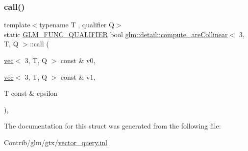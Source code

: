 \subsubsection{\texorpdfstring{call()}{call()}}
{\footnotesize\ttfamily template$<$typename T , qualifier Q$>$ \\
static \mbox{\hyperlink{setup_8hpp_a33fdea6f91c5f834105f7415e2a64407}{G\+L\+M\+\_\+\+F\+U\+N\+C\+\_\+\+Q\+U\+A\+L\+I\+F\+I\+ER}} bool \mbox{\hyperlink{structglm_1_1detail_1_1compute__are_collinear}{glm\+::detail\+::compute\+\_\+are\+Collinear}}$<$ 3, T, Q $>$\+::call (\begin{DoxyParamCaption}\item[{\mbox{\hyperlink{structglm_1_1vec}{vec}}$<$ 3, T, Q $>$ const \&}]{v0,  }\item[{\mbox{\hyperlink{structglm_1_1vec}{vec}}$<$ 3, T, Q $>$ const \&}]{v1,  }\item[{T const \&}]{epsilon }\end{DoxyParamCaption})\hspace{0.3cm}{\ttfamily [inline]}, {\ttfamily [static]}}



The documentation for this struct was generated from the following file\+:\begin{DoxyCompactItemize}
\item 
Contrib/glm/gtx/\mbox{\hyperlink{vector__query_8inl}{vector\+\_\+query.\+inl}}\end{DoxyCompactItemize}
